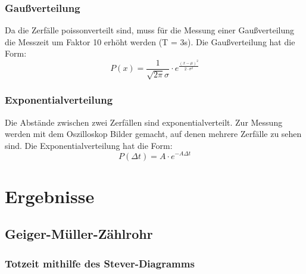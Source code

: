 \documentclass[12pt,a4paper]{article}
\begin{document}
\subsubsection{Gaußverteilung}
Da die Zerfälle poissonverteilt sind, muss für die Messung einer Gaußverteilung die Messzeit um Faktor 10 erhöht werden (T = 3s). Die Gaußverteilung hat die Form:
\begin{equation}
P(x) = \dfrac{1}{\sqrt{2 \pi} \sigma} \cdot e^{\frac{(x - \mu)^2}{2 \cdot \sigma ^2}}
\end{equation}
\subsubsection{Exponentialverteilung}
Die Abstände zwischen zwei Zerfällen sind exponentialverteilt. Zur Messung werden mit dem Oszilloskop Bilder gemacht, auf denen mehrere Zerfälle zu sehen sind. Die Exponentialverteilung hat die Form:
\begin{equation}
P(\Delta t) = A \cdot e^{- A \Delta t}
\end{equation}

\section{Ergebnisse}
\subsection{Geiger-Müller-Zählrohr}

\subsubsection{Totzeit mithilfe des Stever-Diagramms}
\end{document}
